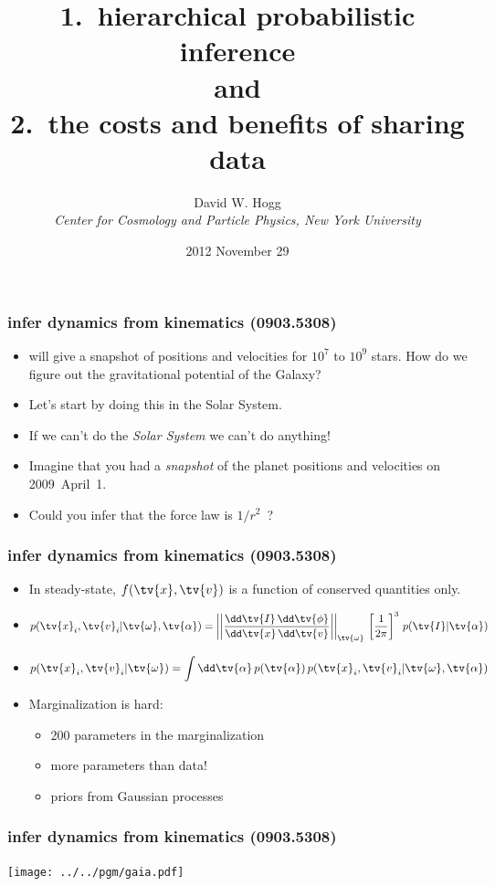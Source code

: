 \documentclass[pdftex]{beamer}
\title{1.~hierarchical probabilistic inference \\ {\small and} \\ 2.~the costs and benefits of sharing data}
\author[David W. Hogg (NYU)]{David W. Hogg \\
  \textsl{\small Center for Cosmology and Particle Physics,
                 New York University}}
\date{2012 November 29}
\begin{document}
\begin{frame}
  \titlepage
\end{frame}

\begin{frame}
  \frametitle{infer dynamics from kinematics {\small (0903.5308)}}
  \begin{itemize}
  \item {} will give a snapshot of positions and
    velocities for $10^7$ to $10^9$ stars.  How do we figure out the
    gravitational potential of the Galaxy?
  \item<2-> Let's start by doing this in the Solar System.
  \item<2-> If we can't do the \emph{Solar System} we can't do anything!
  \item<2-> Imagine that you had a \emph{snapshot} of the planet positions
    and velocities on 2009~April~1.
  \item<2-> Could you infer that the force law is $1/r^2$~?
  \end{itemize}
\end{frame}

\begin{frame}
  \frametitle{infer dynamics from kinematics {\small (0903.5308)}}
  \begin{itemize}
  \item In steady-state, $f(\tv{x},\tv{v})$ is a function of conserved
    quantities only.
  \item $\displaystyle
        p(\tv{x}_i,\tv{v}_i|\tv{\omega},\tv{\alpha})
      = \left|\left|\frac{\dd\tv{I}\,\dd\tv{\phi}}{\dd\tv{x}\,\dd\tv{v}}\right|\right|_{\tv{\omega}}\,\left[\frac{1}{2\pi}\right]^3
      \,p(\tv{I}|\tv{\alpha})$
  \item<2-> $\displaystyle
        p(\tv{x}_i,\tv{v}_i|\tv{\omega})
      = \int \dd\tv{\alpha}\,p(\tv{\alpha})
      \,p(\tv{x}_i,\tv{v}_i|\tv{\omega},\tv{\alpha})$
  \item<2-> Marginalization is hard:
    \begin{itemize}
    \item 200 parameters in the marginalization
    \item more parameters than data!
    \item priors from Gaussian processes
    \end{itemize}
  \end{itemize}
\end{frame}

\begin{frame}
  \frametitle{infer dynamics from kinematics {\small (0903.5308)}}
  \texttt{[image: ../../pgm/gaia.pdf]}
\end{frame}
\end{document}
